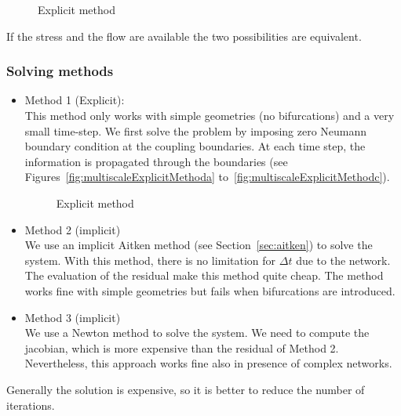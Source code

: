 \documentclass[11pt]{article}
\begin{document}
\begin{figure}[H]
\centering
{}
\caption{Explicit method}
\label{fig:multiscaleBC}
\end{figure}

If the stress and the flow are available the two possibilities are equivalent.

\subsubsection{Solving methods}
\begin{itemize}
\item Method 1 (Explicit):\\
This method only works with simple geometries (no bifurcations) and a very small time-step. We first solve the problem by imposing zero Neumann boundary condition at the coupling boundaries. At each time step, the information is propagated through the boundaries (see Figures~\ref{fig:multiscaleExplicitMethoda} to~\ref{fig:multiscaleExplicitMethodc}).
\begin{figure}[H]
\centering
{}
\caption{Explicit method}
\label{fig:multiscaleExplicitMethod}
\end{figure}

\item Method 2 (implicit)\\
We use an implicit Aitken method (see Section~\ref{sec:aitken}) to solve the system. With this method, there is no limitation for $\Delta t$ due to the network. The evaluation of the residual make this method quite cheap. The method works fine with simple geometries but fails when bifurcations are introduced.

\item Method 3 (implicit)\\
We use a Newton method to solve the system. We need to compute the jacobian, which is more expensive than the residual of Method 2. Nevertheless, this approach works fine also in presence of complex networks.

\end{itemize}
Generally the solution is expensive, so it is better to reduce the number of iterations.
\end{document}

